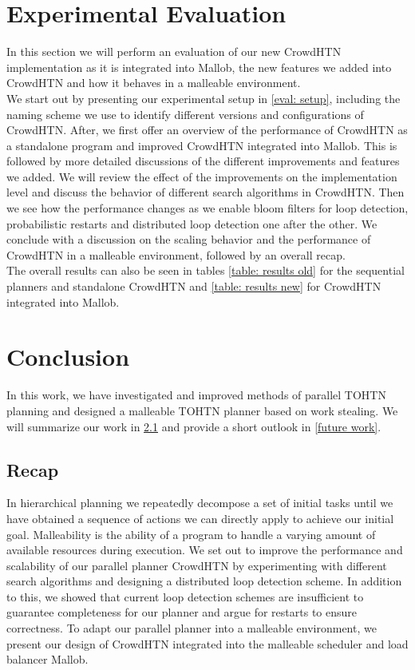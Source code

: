 \documentclass[enabledeprecatedfontcommands,12pt,a4paper,twoside]{scrartcl}
\numberwithin{equation}{section}
\begin{document}
\section{Experimental Evaluation}
\label{eval}
In this section we will perform an evaluation of our new CrowdHTN implementation as it is integrated into Mallob, the new features we added into CrowdHTN and how it behaves in a malleable environment. \\
We start out by presenting our experimental setup in \ref{eval: setup}, including the naming scheme we use to identify different versions and configurations of CrowdHTN. After, we first offer an overview of the performance of CrowdHTN as a standalone program and improved CrowdHTN integrated into Mallob.
This is followed by more detailed discussions of the different improvements and features we added. We will review the effect of the improvements on the implementation level and discuss the behavior of different search algorithms in CrowdHTN. Then we see how the performance changes as we enable bloom filters for loop detection, probabilistic restarts and distributed loop detection one after the other. We conclude with a discussion on the scaling behavior and the performance of CrowdHTN in a malleable environment, followed by an overall recap. \\
The overall results can also be seen in tables \ref{table: results old} for the sequential planners and standalone CrowdHTN and \ref{table: results new} for CrowdHTN integrated into Mallob.

\clearpage
\pagebreak
\section{Conclusion}
\label{conclusion}
In this work, we have investigated and improved methods of parallel TOHTN planning and designed a malleable TOHTN planner based on work stealing. We will summarize our work in \ref{recap} and provide a short outlook in \ref{future work}.

\subsection{Recap}
\label{recap}
In hierarchical planning we repeatedly decompose a set of initial tasks until we have obtained a sequence of actions we can directly apply to achieve our initial goal. Malleability is the ability of a program to handle a varying amount of available resources during execution. We set out to improve the performance and scalability of our parallel planner CrowdHTN by experimenting with different search algorithms and designing a distributed loop detection scheme.
In addition to this, we showed that current loop detection schemes are insufficient to guarantee completeness for our planner and argue for restarts to ensure correctness.
To adapt our parallel planner into a malleable environment, we present our design of CrowdHTN integrated into the malleable scheduler and load balancer Mallob. \\
\end{document}
